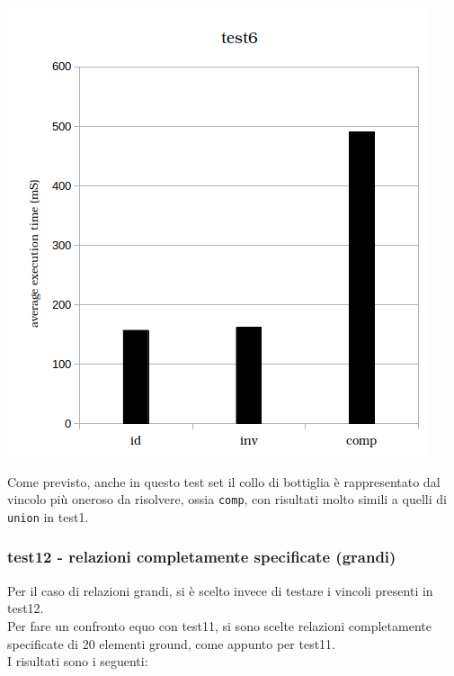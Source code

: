 \begin{center}
\includegraphics[scale=0.8]{images/histogram_test6.png}
\end{center}

Come previsto, anche in questo test set il collo di bottiglia è rappresentato dal vincolo più oneroso da risolvere, ossia \texttt{comp}, con risultati molto simili a quelli di \texttt{union} in test1.

\subsubsection{test12 - relazioni completamente specificate (grandi)}

Per il caso di relazioni grandi, si è scelto invece di testare i vincoli presenti in test12.\\
Per fare un confronto equo con test11, si sono scelte relazioni completamente specificate di 20 elementi ground, come appunto per test11.\\

I risultati sono i seguenti:\\ 


